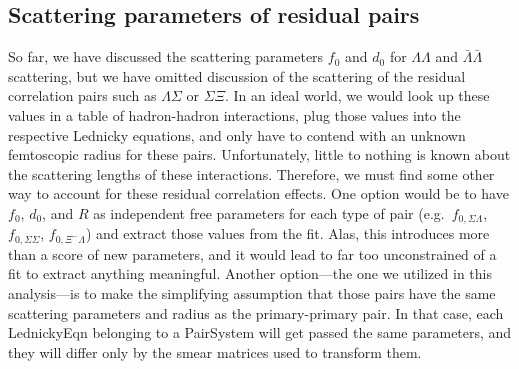 \subsection{Scattering parameters of residual pairs}
\label{sec:ScatteringParams}


So far, we have discussed the scattering parameters $f_0$ and $d_0$ for $\Lambda\Lambda$ and $\bar{\Lambda}\bar{\Lambda}$ scattering, but we have omitted discussion of the scattering of the residual correlation pairs such as $\Lambda\Sigma$ or $\Sigma\Xi$.
In an ideal world, we would look up these values in a table of hadron-hadron interactions, plug those values into the respective Lednicky equations, and only have to contend with an unknown femtoscopic radius for these pairs.
Unfortunately, little to nothing is known about the scattering lengths of these interactions.
Therefore, we must find some other way to account for these residual correlation effects.
One option would be to have $f_0$, $d_0$, and $R$ as independent free parameters for each type of pair (e.g.\ $f_{0,\Sigma\Lambda}$, $f_{0,\Sigma\Sigma}$, $f_{0,\Xi^-\Lambda}$) and extract those values from the fit. 
Alas, this introduces more than a score of new parameters, and it would lead to far too unconstrained of a fit to extract anything meaningful.
Another option---the one we utilized in this analysis---is to make the simplifying assumption that those pairs have the same scattering parameters and radius as the primary-primary pair.
In that case, each LednickyEqn belonging to a PairSystem will get passed the same parameters, and they will differ only by the smear matrices used to transform them.



